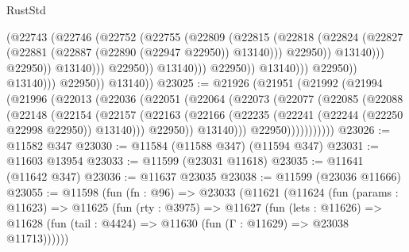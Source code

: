 \begin{lexlean}{RustStd}
\begin{coremodule}
                                              (@22743
                                                (@22746
                                                  (@22752
                                                    (@22755
                                                      (@22809
                                                        (@22815
                                                          (@22818
                                                            (@22824
                                                              (@22827
                                                                (@22881
                                                                  (@22887
                                                                    (@22890 (@22947 @22950))
                                                                    @13140)))
                                                              @22950))
                                                          @13140)))
                                                    @22950))
                                                @13140)))
                                          @22950))
                                      @13140)))
                                @22950))
                            @13140)))
                      @22950))
                  @13140)))
            @22950))
        @13140))
@23025 := @21926
    (@21951
      (@21992
        (@21994
          (@21996
            (@22013
              (@22036
                (@22051
                  (@22064
                    (@22073
                      (@22077
                        (@22085
                          (@22088
                            (@22148
                              (@22154
                                (@22157
                                  (@22163
                                    (@22166
                                      (@22235 (@22241 (@22244 (@22250 @22998 @22950)) @13140)))
                                    @22950))
                                @13140)))
                          @22950)))))))))))
@23026 := @11582 @347
@23030 := @11584 (@11588 @347) (@11594 @347)
@23031 := @11603 @13954
@23033 := @11599 (@23031 @11618)
@23035 := @11641 (@11642 @347)
@23036 := @11637 @23035
@23038 := @11599 (@23036 @11666)
@23055 := @11598
    (fun (fn : @96) =>
    @23033
      (@11621
        (@11624
          (fun (params : @11623) =>
          @11625
            (fun (rty : @3975) =>
            @11627
              (fun (lets : @11626) =>
              @11628 (fun (tail : @4424) => @11630 (fun (Γ : @11629) => @23038 @11713))))))

\end{coremodule}
\end{lexlean}
